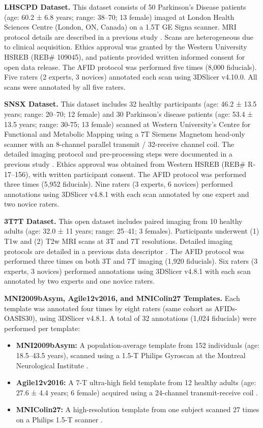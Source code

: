 \textbf{LHSCPD Dataset.} This dataset consists of 50 Parkinson’s Disease patients (age: 60.2 ± 6.8 years; range: 38–70; 13 female) imaged at London Health Sciences Centre (London, ON, Canada) on a 1.5T GE Signa scanner. MRI protocol details are described in a previous study \cite{Abbass2022-lf}. Scans are heterogeneous due to clinical acquisition. Ethics approval was granted by the Western University HSREB (REB\# 109045), and patients provided written informed consent for open data release. The AFID protocol was performed five times (8,000 fiducials). Five raters (2 experts, 3 novices) annotated each scan using 3DSlicer v4.10.0. All scans were annotated by all five raters.

\textbf{SNSX Dataset.} This dataset includes 32 healthy participants (age: 46.2 ± 13.5 years; range: 20–70; 12 female) and 30 Parkinson's disease patients (age: 53.4 ± 13.5 years; range: 30-75; 13 female) scanned at Western University's Centre for Functional and Metabolic Mapping using a 7T Siemens Magnetom head-only scanner with an 8-channel parallel transmit / 32-receive channel coil. The detailed imaging protocol and pre-processing steps were documented in a previous study \cite{Lau2020-dh}. Ethics approval was obtained from Western HSREB (REB\# R-17–156), with written participant consent. The AFID protocol was performed three times (5,952 fiducials). Nine raters (3 experts, 6 novices) performed annotations using 3DSlicer v4.8.1 with each scan annotated by one expert and two novice raters.

\textbf{3T7T Dataset.} This open dataset includes paired imaging from 10 healthy adults (age: 32.0 ± 11 years; range: 25–41; 3 females). Participants underwent (1) T1w and (2) T2w MRI scans at 3T and 7T resolutions. Detailed imaging protocols are detailed in a previous data descriptor \cite{Chen2023-cn}. The AFID protocol was performed three times on both 3T and 7T imaging (1,920 fiducials). Six raters (3 experts, 3 novices) performed annotations using 3DSlicer v4.8.1 with each scan annotated by two experts and one novice raters.

\textbf{MNI2009bAsym, Agile12v2016, and MNIColin27 Templates.} Each template was annotated four times by eight raters (same cohort as AFIDs-OASIS30), using 3DSlicer v4.8.1. A total of 32 annotations (1,024 fiducials) were performed per template:

\begin{itemize}
    \item \textbf{MNI2009bAsym:} A population-average template from 152 individuals (age: 18.5–43.5 years), scanned using a 1.5-T Philips Gyroscan at the Montreal Neurological Institute \cite{Fonov2009-oi}.
    \item \textbf{Agile12v2016:} A 7-T ultra-high field template from 12 healthy adults (age: 27.6 ± 4.4 years; 6 female) acquired using a 24-channel transmit-receive coil \cite{Lau2017-ea}.
    \item \textbf{MNIColin27:} A high-resolution template from one subject scanned 27 times on a Philips 1.5-T scanner \cite{Collins1994-dx}.
\end{itemize}


